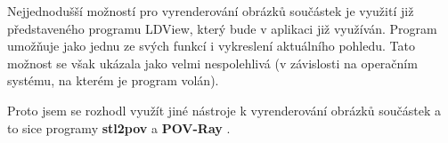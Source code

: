 Nejjednodušší možností pro vyrenderování obrázků součástek je využití již představeného programu LDView, který bude v aplikaci již využíván. Program umožňuje jako jednu ze svých funkcí i vykreslení aktuálního pohledu. Tato možnost se však ukázala jako velmi nespolehlivá (v závislosti na operačním systému, na kterém je program volán).

Proto jsem se rozhodl využít jiné nástroje k vyrenderování obrázků součástek a to sice programy \textbf{stl2pov} \autocite{stl2pov} a \textbf{POV-Ray} \autocite{povray}.

